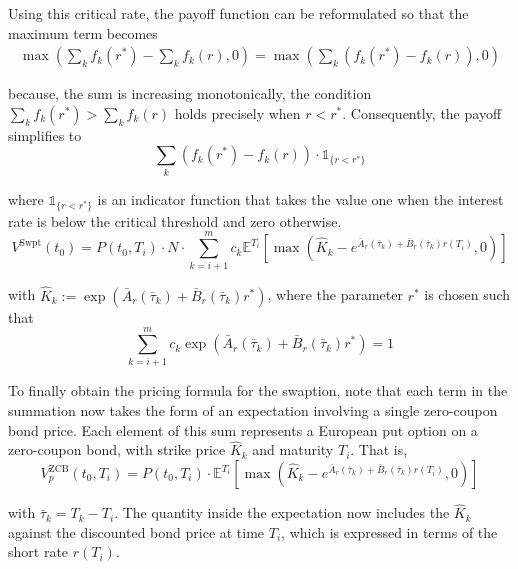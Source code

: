     \noindent
    Using this critical rate, the payoff function can be reformulated so that the maximum term becomes
    \begin{gather}
        \max\left( \sum_{k} f_k(r^*) - \sum_{k} f_k(r), 0 \right) = \max\left( \sum_{k} \left( f_k(r^*) - f_k(r) \right), 0 \right)
    \end{gather}

    \noindent
     because, the sum is increasing monotonically, the condition \( \sum_{k} f_k(r^*) > \sum_{k} f_k(r) \) holds precisely when \( r < r^* \). Consequently, the payoff simplifies to
   \begin{equation}
       \sum_{k} \left( f_k(r^*) - f_k(r) \right) \cdot \mathbb{1}_{\{ r < r^* \}}
   \end{equation} 
   
    \noindent
    where \( \mathbb{1}_{\{ r < r^* \}} \) is an indicator function that takes the value one when the interest rate is below the critical threshold and zero otherwise. \\
    \begin{equation}
        V^{\text{Swpt}}(t_0) = P(t_0, T_i) \cdot N \cdot \sum_{k=i+1}^m c_k \mathbb{E}^{T_i} \left[ \max \left( \hat{K}_k - e^{\bar{A}_r(\bar{\tau}_k) + \bar{B}_r(\bar{\tau}_k) r(T_i)}, 0 \right) \right]
    \end{equation}

    \noindent
    with \(\hat{K}_k := \exp \left( \bar{A}_r(\bar{\tau}_k) + \bar{B}_r(\bar{\tau}_k) r^* \right)\), where the parameter \(r^*\) is chosen such that
    \begin{equation}
        \sum_{k=i+1}^m c_k \exp \left( \bar{A}_r(\bar{\tau}_k) + \bar{B}_r(\bar{\tau}_k) r^* \right) = 1
    \end{equation}
    
    \noindent
    To finally obtain the pricing formula for the swaption, note that each term in the summation now takes the form of an expectation involving a single zero-coupon bond price. Each element of this sum represents a European put option on a zero-coupon bond, with strike price \(\hat{K}_k\) and maturity \(T_i\). That is,
    \begin{equation}
        V_p^{\text{ZCB}}(t_0, T_i) = P(t_0, T_i) \cdot \mathbb{E}^{T_i} \left[ \max \left( \hat{K}_k - e^{\bar{A}_r(\bar{\tau}_k) + \bar{B}_r(\bar{\tau}_k) r(T_i)}, 0 \right) \right]
    \end{equation}

    \noindent
    with \(\bar{\tau}_k = T_k - T_i\). The quantity inside the expectation now includes the \(\hat{K}_k\) against the discounted bond price at time \(T_i\), which is expressed in terms of the short rate \(r(T_i)\).\\

